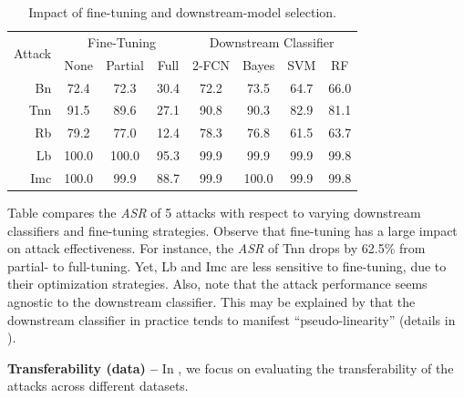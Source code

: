 \documentclass[compsoc,conference,a4paper,10pt,times]{IEEEtran}
\newcommand{\bn}{{\sc Bn}\xspace}
\newcommand{\tnn}{{\sc Tnn}\xspace}
\newcommand{\lb}{{\sc Lb}\xspace}
\newcommand{\rfb}{{\sc Rb}\xspace}
\newcommand{\imc}{{\sc Imc}\xspace}
\newcommand{\asr}{{\em \small ASR}\xspace}
\begin{document}
\begin{table}[!ht]
    {\footnotesize
    \centering
    \renewcommand{\arraystretch}{1.2}
  \setlength{\tabcolsep}{5pt}
    \begin{tabular}{r|c|c|c|c|c|c|c}
    \multirow{2}{*}{Attack} & \multicolumn{3}{c|}{Fine-Tuning} & \multicolumn{4}{c}{Downstream Classifier} \\
    \cline{2-8}
    & {None} & {Partial} & {Full} & {2-FCN} & {Bayes} & {SVM}  & {RF}\\
    \hline
    \hline 
    \bn & 72.4 & 72.3 & 30.4 &  72.2 &  73.5 & 64.7 & 66.0 \\
    \tnn & 91.5 &  89.6 & 27.1 &  90.8 & 90.3 & 82.9 & 81.1 \\ 
    \rfb & 79.2 & 77.0 & 12.4 &  78.3 & 76.8 & 61.5 & 63.7 \\
    \lb & {\cellcolor{Red}}100.0 & {\cellcolor{Red}}100.0 &  {\cellcolor{Red}}95.3 &  {\cellcolor{Red}}99.9 & 99.9 &  {\cellcolor{Red}}99.9 &  {\cellcolor{Red}}99.8 \\
    \imc & {\cellcolor{Red}}100.0 &  99.9 & 88.7 &   {\cellcolor{Red}}99.9 &  {\cellcolor{Red}}100.0 & {\cellcolor{Red}}99.9 &  {\cellcolor{Red}}99.8 \\ 
    \end{tabular}
    \caption{Impact of fine-tuning and downstream-model selection.\label{tab:fine-tune} }}
\end{table}
    


Table compares the \asr of 5 attacks with respect to varying downstream classifiers and fine-tuning strategies. Observe that fine-tuning has a large impact on attack effectiveness. For instance, the \asr of \tnn drops by 62.5\% from partial- to full-tuning. Yet, \lb and \imc are less sensitive to fine-tuning, due to their optimization strategies. Also, note that the attack performance seems agnostic to the downstream classifier. This may be explained by that the downstream classifier in practice tends to manifest ``pseudo-linearity'' (details in ). 



\vspace{2pt}
{\bf Transferability (data) --} In , we focus on evaluating the transferability of the attacks across different datasets.
\end{document}
